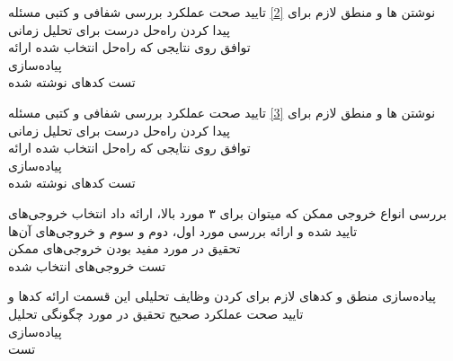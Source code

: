 \begin{wbsbox}{}
\begin{wbssub}
{نوشتن ها و منطق لازم برای \ref{2}}
{تایید صحت عملکرد}
\task 
بررسی شفافی و کتبی مسئله \\
\task
پیدا کردن راه‌حل درست برای تحلیل زمانی \\
\task
توافق روی نتایجی که راه‌حل انتخاب شده ارائه \\
\task
پیاده‌سازی \\
\task
تست کد‌‌های نوشته شده
\end{wbssub}

\begin{wbssub}
{نوشتن ها و منطق لازم برای \ref{3}}
{تایید صحت عملکرد}
\task 
بررسی شفافی و کتبی مسئله \\
\task
پیدا کردن راه‌حل درست برای تحلیل زمانی \\
\task
توافق روی نتایجی که راه‌حل انتخاب شده ارائه \\
\task
پیاده‌سازی \\
\task
تست کد‌‌های نوشته شده
\end{wbssub}

\begin{wbssub}
{بررسی انواع خروجی ممکن که میتوان برای ۳ مورد بالا، ارائه داد}
{انتخاب خروجی‌های تایید شده و ارائه}
\task
بررسی مورد اول، دوم و سوم و خروجی‌های آن‌ها \\
\task
تحقیق در مورد مفید بودن خروجی‌های ممکن \\
\task
تست خروجی‌های انتخاب شده
\end{wbssub}

\begin{wbssub}
{پیاده‌سازی منطق‌ و کد‌های لازم برای  کردن وظایف تحلیلی این قسمت}
{ارائه کد‌‌ها و تایید صحت عملکرد صحیح}
\task
تحقیق در مورد چگونگی تحلیل \\
\task
پیاده‌سازی \\
\task
تست
\end{wbssub}
\end{wbsbox}
